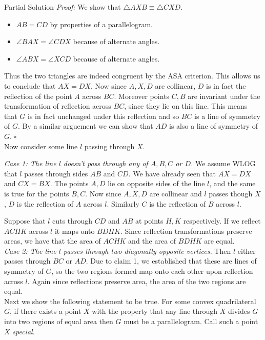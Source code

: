 \documentclass{article}
\begin{document}
\begin{solution}{Partial Solution}
\textit{Proof:} We show that $\triangle AXB \equiv \triangle CXD$.
\begin{itemize}
\item $AB = CD$ by properties of a parallelogram.
\item $\angle BAX = \angle CDX$ because of alternate angles.
\item $\angle ABX = \angle XCD$ because of alternate angles.
\end{itemize}
Thus the two triangles are indeed congruent by the ASA criterion. This
allows us to conclude that $AX = DX$. Now since $A,X,D$ are collinear,
$D$ is in fact the reflection of the point $A$ across $BC$. Moreover
points $C, B$ are invariant under the transformation of reflection across
$BC$, since they lie on this line. This means that $G$ is in fact unchanged
under this reflection and so $BC$ is a line of symmetry
of $G$. By a similar arguement we can show that $AD$ is also a line of
symmetry of $G$.
$\square$
\\

Now consider some line $l$ passing through $X$.
\vspace{0.2cm}

\textit{Case 1: The line $l$ doesn't pass through any of $A, B, C$ or $D$.}
We assume WLOG that $l$ passes through sides $AB$ and $CD$. We have
already seen that $AX = DX$ and $CX = BX$. The points $A, D$ lie on
opposite sides of the line $l$, and the same is true for the points
$B, C$. Now since $A, X, D$ are collinear and $l$ passes though $X$,
$D$ is the reflection of $A$ across $l$.
Similarly $C$ is the reflection of $B$ across $l$. \vspace{0.2cm}

Suppose that $l$ cuts through $CD$ and $AB$ at points $H, K$ respectively.
If we reflect $ACHK$ across $l$ it maps onto $BDHK$. Since
reflection transformations preserve areas, we have that the area of
$ACHK$ and the area of $BDHK$ are equal.
\\

\textit{Case 2: The line $l$ passes through two diagonally opposite
vertices.} Then $l$ either passes through $BC$ or $AD$. Due to claim 1,
we established that these are lines of symmetry of $G$, so the two regions
formed map onto each other upon reflection across $l$. Again since
reflections preserve area, the area of the two regions are equal.
\\

Next we show the following statement to be true. For some convex
quadrilateral $G$, if there exists a point $X$ with the property that
any line through $X$ divides $G$ into two regions of equal area then $G$
must be a parallelogram. Call such a point $X$ \textit{special}.
\vspace{0.2cm}


\end{solution}
\end{document}
